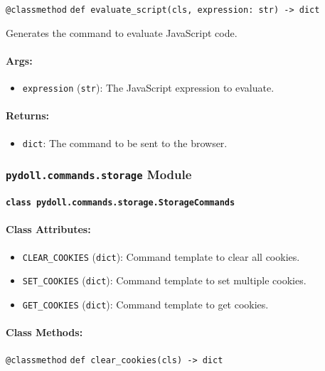 \documentclass{article}
\begin{document}
\noindent\texttt{@classmethod}
\noindent\texttt{def evaluate\_script(cls, expression: str) -> dict}

\noindent Generates the command to evaluate JavaScript code.

\paragraph{Args:}
\begin{itemize}
    \item \texttt{expression} (\texttt{str}): The JavaScript expression to evaluate.
\end{itemize}

\paragraph{Returns:}
\begin{itemize}
    \item \texttt{dict}: The command to be sent to the browser.
\end{itemize}

\subsubsection*{\texttt{pydoll.commands.storage} Module}

\paragraph*{\texttt{class pydoll.commands.storage.StorageCommands}}

\paragraph{Class Attributes:}
\begin{itemize}
    \item \texttt{CLEAR\_COOKIES} (\texttt{dict}): Command template to clear all cookies.
    \item \texttt{SET\_COOKIES} (\texttt{dict}): Command template to set multiple cookies.
    \item \texttt{GET\_COOKIES} (\texttt{dict}): Command template to get cookies.
\end{itemize}

\paragraph{Class Methods:}
\noindent\texttt{@classmethod}
\noindent\texttt{def clear\_cookies(cls) -> dict}
\end{document}
